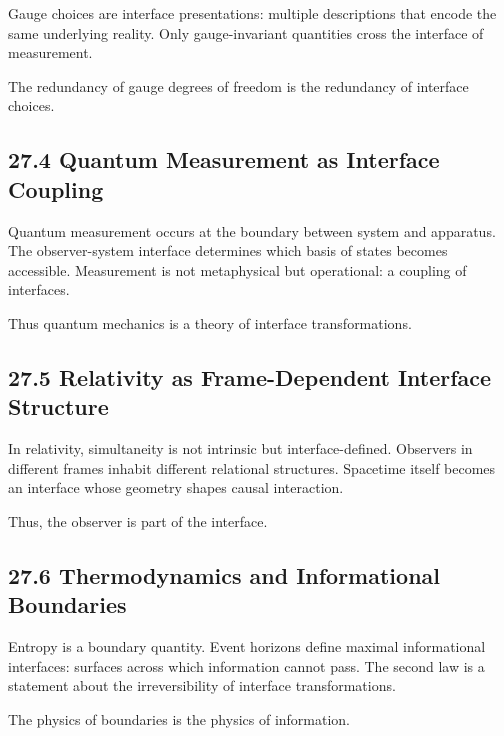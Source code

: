 \documentclass[12pt,letterpaper]{article}
\theoremstyle{remark}
\begin{document}
Gauge choices are interface presentations: multiple descriptions that encode the same underlying reality. Only gauge-invariant quantities cross the interface of measurement.

The redundancy of gauge degrees of freedom is the redundancy of interface choices.

\subsection{27.4 Quantum Measurement as Interface Coupling}

Quantum measurement occurs at the boundary between system and apparatus. The observer-system interface determines which basis of states becomes accessible. Measurement is not metaphysical but operational: a coupling of interfaces.

Thus quantum mechanics is a theory of interface transformations.

\subsection{27.5 Relativity as Frame-Dependent Interface Structure}

In relativity, simultaneity is not intrinsic but interface-defined. Observers in different frames inhabit different relational structures. Spacetime itself becomes an interface whose geometry shapes causal interaction.

Thus, the observer is part of the interface.

\subsection{27.6 Thermodynamics and Informational Boundaries}

Entropy is a boundary quantity. Event horizons define maximal informational interfaces: surfaces across which information cannot pass. The second law is a statement about the irreversibility of interface transformations.

The physics of boundaries is the physics of information.

\end{document}

